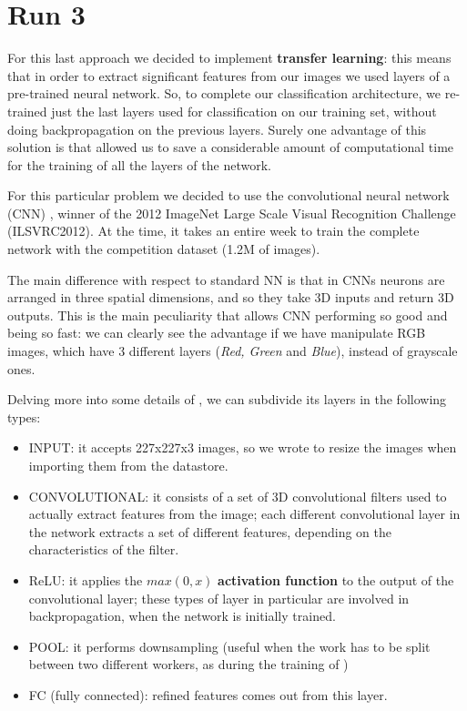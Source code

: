 \section{Run 3}
For this last approach we decided to implement \textbf{transfer learning}: this means that in order to extract significant features from our images we used layers of a pre-trained neural network. So, to complete our classification architecture, we re-trained just the last layers used for classification on our training set, without doing backpropagation on the previous layers. Surely one advantage of this solution is that allowed us to save a considerable amount of computational time for the training of all the layers of the network.

For this particular problem we decided to use the convolutional neural network (CNN) , winner of the 2012 ImageNet Large Scale Visual Recognition Challenge (ILSVRC2012). At the time, it takes an entire week to train the complete network with the competition dataset (1.2M of images).

The main difference with respect to standard NN is that in CNNs neurons are arranged in three spatial dimensions, and so they take 3D inputs and return 3D outputs. This is the main peculiarity that allows CNN performing so good and being so fast: we can clearly see the advantage if we have manipulate RGB images, which have 3 different layers (\textit{Red, Green} and \textit{Blue}), instead of grayscale ones. 

Delving more into some details of , we can subdivide its layers in the following types:
\begin{itemize}
	\item INPUT: it accepts 227x227x3 images, so we wrote  to resize the images when importing them from the datastore.
	\item CONVOLUTIONAL: it consists of a set of 3D convolutional filters used to actually extract features from the image; each different convolutional layer in the network extracts a set of different features, depending on the characteristics of the filter.
	\item ReLU: it applies the $max(0,x)$ \textbf{activation function} to the output of the convolutional layer; these types of layer in particular are involved in backpropagation, when the network is initially trained.
	\item POOL: it performs downsampling (useful when the work has to be split between two different workers, as during the training of )
	\item FC (fully connected): refined features comes out from this layer.
\end{itemize}

